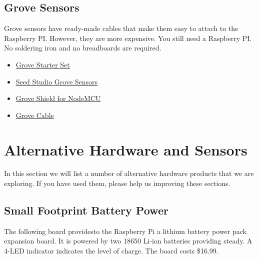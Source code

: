 \subsection{Grove Sensors}\label{grove-sensors}

Grove sensors have ready-made cables that make them easy to attach to
the Raspberry PI. However, they are more expensive. You still need a
Raspberry PI. No soldering iron and no breadboards are required.

\begin{itemize}
\tightlist
\item
  \href{https://www.seeedstudio.com/Grove-Starter-Kit-for-Arduino-p-1855.html}{Grove
  Starter Set}
\item
  \href{https://www.seeedstudio.com/category/Grove-c-1003.html}{Seed
  Studio Grove Sensors}
\item
  \href{https://www.seeedstudio.com/Grove-Base-Shield-for-NodeMCU-p-2513.html}{Grove
  Shield for NodeMCU}
\item
  \href{http://www.switchdoc.com/2016/02/tutorial-intro-to-grove-connectors-for-arduinoraspberry-pi-projects/}{Grove
  Cable}
\end{itemize}

\section{Alternative Hardware and Sensors}

In this section we will list a number of alternative hardware products
that we are exploring. If you have used them, please help us improving
these sections.

\subsection{Small Footprint Battery Power}

The following board providesto the Raspberry Pi a lithium battery
power pack expansion board. It is powered by two 18650 Li-ion
batteries providing steady. A 4-LED indicator indicates the level of
charge. The board costs \$16.99.

